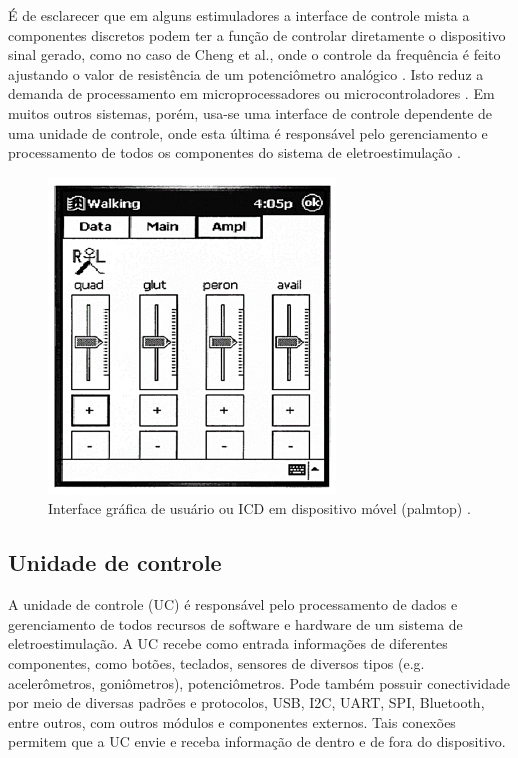 É de esclarecer que em alguns estimuladores a interface de controle mista a componentes discretos podem ter a função de controlar diretamente o dispositivo sinal gerado, como no caso de Cheng et al., onde o controle da frequência é feito ajustando o valor de resistência de um potenciômetro analógico \cite{Cheng2004}. Isto reduz a demanda de processamento em microprocessadores ou microcontroladores \cite{Gaiotto2012}. Em muitos outros sistemas, porém, usa-se uma interface de controle dependente de uma unidade de controle, onde esta última é responsável pelo gerenciamento e processamento de todos os componentes do sistema de eletroestimulação \cite{Wu2002, Popovic2004, Souza2017,Bijak2002, Martins2008}. 

\begin{figure}
    \centering %
    \includegraphics[width=0.35\linewidth]{figs/Fig_c3/icd_f6}
    \caption{Interface gráfica de usuário ou \acrshort{ICD} em dispositivo móvel (palmtop)  \cite{Bijak2002}.}
    \label{fig:icd_f6}
\end{figure}

\subsection{Unidade de controle}

A unidade de controle (\acrshort{UC}) é responsável pelo processamento de dados e gerenciamento de todos recursos de software e hardware de um sistema de eletroestimulação. A \acrshort{UC} recebe como entrada informações de diferentes componentes, como botões, teclados, sensores de diversos tipos (e.g. acelerômetros, goniômetros), potenciômetros. Pode também possuir conectividade por meio de diversas padrões e protocolos, \acrshort{USB}, \acrshort{I2C}, \acrshort{UART}, \acrshort{SPI}, Bluetooth, entre outros, com outros módulos e componentes externos. Tais conexões permitem que a \acrshort{UC} envie e receba informação de dentro e de fora do dispositivo. 

